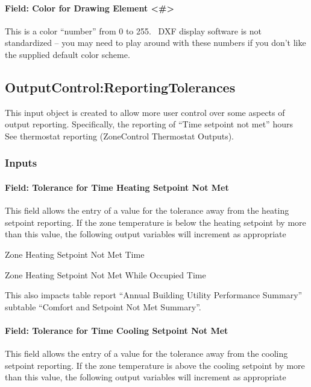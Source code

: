 \paragraph{Field: Color for Drawing Element \textless{}\#\textgreater{}}\label{field-color-for-drawing-element}

This is a color ``number'' from 0 to 255.~ DXF display software is not standardized -- you may need to play around with these numbers if you don't like the supplied default color scheme.

\subsection{OutputControl:ReportingTolerances}\label{outputcontrolreportingtolerances}

This input object is created to allow more user control over some aspects of output reporting. Specifically, the reporting of ``Time setpoint not met'' hours~ See thermostat reporting (ZoneControl Thermostat Outputs).

\subsubsection{Inputs}\label{inputs-7-021}

\paragraph{Field: Tolerance for Time Heating Setpoint Not Met}\label{field-tolerance-for-time-heating-setpoint-not-met}

This field allows the entry of a value for the tolerance away from the heating setpoint reporting. If the zone temperature is below the heating setpoint by more than this value, the following output variables will increment as appropriate

Zone Heating Setpoint Not Met Time

Zone Heating Setpoint Not Met While Occupied Time

This also impacts table report ``Annual Building Utility Performance Summary'' subtable ``Comfort and Setpoint Not Met Summary''.

\paragraph{Field: Tolerance for Time Cooling Setpoint Not Met}\label{field-tolerance-for-time-cooling-setpoint-not-met}

This field allows the entry of a value for the tolerance away from the cooling setpoint reporting. If the zone temperature is above the cooling setpoint by more than this value, the following output variables will increment as appropriate


